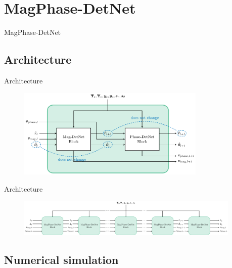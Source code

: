 \documentclass[en]{sdqbeamer}
\begin{document}
\section{MagPhase-DetNet}

\begin{frame}{}{}
\center\Huge MagPhase-DetNet
\end{frame}


\subsection{Architecture}

\begin{frame}{Architecture}
\begin{figure}[htb]
     \centering
	\includegraphics[width=0.8\textwidth]{magPhaseDetNet_block.pdf}
\end{figure}

\end{frame}

\begin{frame}{Architecture}
\begin{figure}[htb]
         \centering
         \includegraphics[width=0.95\textwidth]{magPhaseDetNet_architecture.pdf}
\end{figure}

\end{frame}

\subsection{Numerical simulation}
\end{document}
